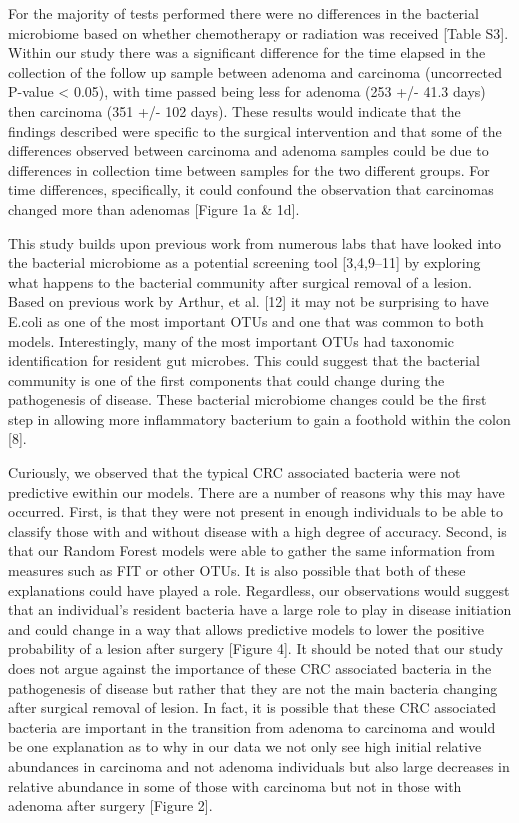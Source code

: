 \documentclass[12pt,]{article}
\begin{document}
For the majority of tests performed there were no differences in the
bacterial microbiome based on whether chemotherapy or radiation was
received {[}Table S3{]}. Within our study there was a significant
difference for the time elapsed in the collection of the follow up
sample between adenoma and carcinoma (uncorrected P-value \textless{}
0.05), with time passed being less for adenoma (253 +/- 41.3 days) then
carcinoma (351 +/- 102 days). These results would indicate that the
findings described were specific to the surgical intervention and that
some of the differences observed between carcinoma and adenoma samples
could be due to differences in collection time between samples for the
two different groups. For time differences, specifically, it could
confound the observation that carcinomas changed more than adenomas
{[}Figure 1a \& 1d{]}.

This study builds upon previous work from numerous labs that have looked
into the bacterial microbiome as a potential screening tool
{[}3,4,9--11{]} by exploring what happens to the bacterial community
after surgical removal of a lesion. Based on previous work by Arthur, et
al. {[}12{]} it may not be surprising to have E.coli as one of the most
important OTUs and one that was common to both models. Interestingly,
many of the most important OTUs had taxonomic identification for
resident gut microbes. This could suggest that the bacterial community
is one of the first components that could change during the pathogenesis
of disease. These bacterial microbiome changes could be the first step
in allowing more inflammatory bacterium to gain a foothold within the
colon {[}8{]}.

Curiously, we observed that the typical CRC associated bacteria were not
predictive ewithin our models. There are a number of reasons why this
may have occurred. First, is that they were not present in enough
individuals to be able to classify those with and without disease with a
high degree of accuracy. Second, is that our Random Forest models were
able to gather the same information from measures such as FIT or other
OTUs. It is also possible that both of these explanations could have
played a role. Regardless, our observations would suggest that an
individual's resident bacteria have a large role to play in disease
initiation and could change in a way that allows predictive models to
lower the positive probability of a lesion after surgery {[}Figure 4{]}.
It should be noted that our study does not argue against the importance
of these CRC associated bacteria in the pathogenesis of disease but
rather that they are not the main bacteria changing after surgical
removal of lesion. In fact, it is possible that these CRC associated
bacteria are important in the transition from adenoma to carcinoma and
would be one explanation as to why in our data we not only see high
initial relative abundances in carcinoma and not adenoma individuals but
also large decreases in relative abundance in some of those with
carcinoma but not in those with adenoma after surgery {[}Figure 2{]}.
\end{document}
